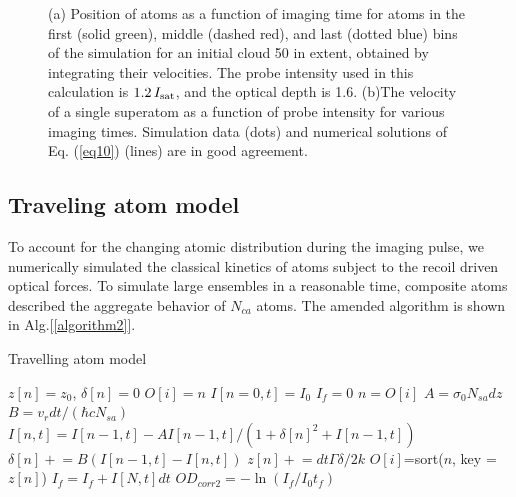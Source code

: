 \documentclass[12pt]{iopart}
\begin{document}
\begin{figure}
\caption{(a) Position of atoms as a function of imaging time for atoms in the first (solid green), middle (dashed red), and last (dotted blue) bins of the simulation for an initial cloud 50 \um{} in extent, obtained by integrating their velocities. The probe intensity used in this calculation is $1.2\, I_{\rm{sat}}$, and the optical depth is 1.6. (b)The velocity of a single superatom as a function of probe intensity for various imaging times. Simulation data (dots) and numerical  solutions of Eq. (\ref{eq10}) (lines) are in good agreement.}  
\label{fig:simTests}
\end{figure}

\subsection{Traveling atom model}
To account for the changing atomic distribution during the imaging pulse, we numerically simulated the classical kinetics of atoms subject to the recoil driven optical forces. To simulate large ensembles in a reasonable time, composite atoms described the aggregate behavior of $N_{ca}$ atoms. The amended algorithm is shown in Alg.[\ref{algorithm2}]. 
\begin{algorithm}
\caption{Travelling atom model}
\label{algorithm2}
\begin{algorithmic}
\STATE $z[n]=z_0$, $\delta[n]=0$ 
\STATE $O[i]=n$ 
\STATE $I[n=0,t]=I_0$  
\STATE $I_f=0$
\STATE $n=O[i]$ 
 \STATE $A=\sigma_0 N_{sa} dz$ 
 \STATE $B=v_r dt/(\hbar c  N_{sa})$  
\STATE $I[n,t]=I[n-1,t] - A I[n-1,t]/(1+\delta[n]^2+I[n-1,t])$  
\STATE $\delta[n]\mathrel{+}=B\left(I[n-1,t]-I[n,t]\right)$   
\STATE $z[n]\mathrel{+}=dt\Gamma\delta/2k$ 
\ENDFOR 
\STATE $O[i]$=sort($n$, key =$z[n]$) 
\STATE $I_f =I_f+ I[N,t]dt$ 
\ENDFOR
\STATE $OD_{corr2}=-\ln{(I_f/I_0t_f)}$
\end{algorithmic}
\end{algorithm}
\end{document}
